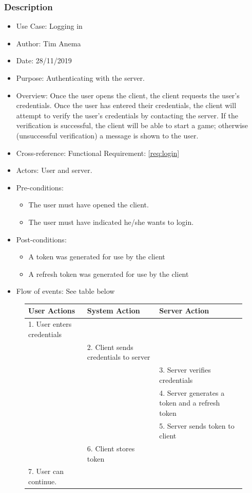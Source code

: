 \documentclass[10pt]{article}
\begin{document}
	\subsubsection{Description}
		\begin{itemize}
			\item{Use Case:} Logging in
			\item{Author:} Tim Anema
			\item{Date:} 28/11/2019
			\item{Purpose:} Authenticating with the server.
			\item{Overview:} Once the user opens the client, the client requests the user's credentials.
			Once the user has entered their credentials, the client will attempt to verify the user's credentials by contacting the server.
			If the verification is successful, the client will be able to start a game; otherwise (unsuccessful verification) a message is shown to the user.
			\item{Cross-reference:} Functional Requirement: \ref{req:login}
			\item{Actors:} User and server.
			\item{Pre-conditions:}
				\begin{itemize}
					\item The user must have opened the client.
					\item The user must have indicated he/she wants to login.
				\end{itemize}
			\item{Post-conditions:}
				\begin{itemize}
					\item A token was generated for use by the client
					\item A refresh token was generated for use by the client
				\end{itemize}
				\item{Flow of events:} See table below
			\end{itemize}
		\begin{figure}[H]
						\begin{tabular}{|p{45mm}|p{45mm}|p{45mm}}
User Actions                                  & System Action                                &
Server Action                                                              \\
\hline
1. User enters credentials& &  \\
& 2. Client sends credentials to server &  \\
& &   3. Server verifies credentials   \\
& &4. Server generates a token and a refresh token\\
& &5. Server sends token to client\\
& 6. Client stores token &   \\
7. User can continue.  & & \\
			\end{tabular}
		\end{figure}
\end{document}
